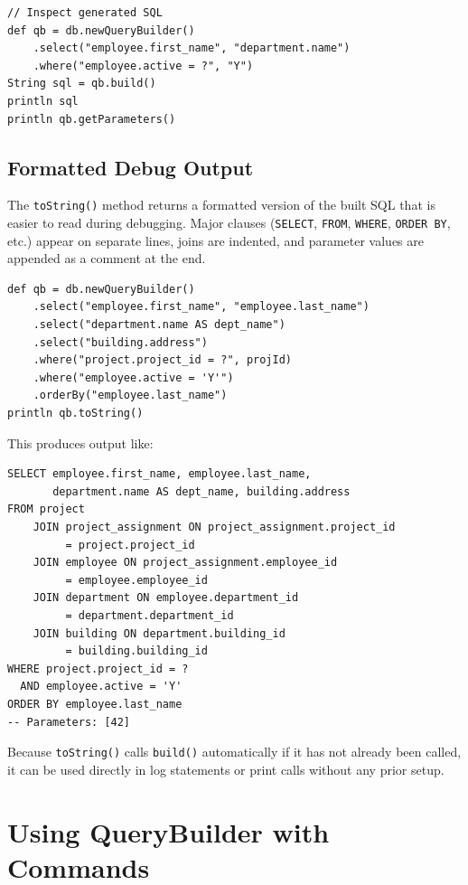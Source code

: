 \begin{lstlisting}[style=groovy]
// Inspect generated SQL
def qb = db.newQueryBuilder()
    .select("employee.first_name", "department.name")
    .where("employee.active = ?", "Y")
String sql = qb.build()
println sql
println qb.getParameters()
\end{lstlisting}

\subsection{Formatted Debug Output}

The \texttt{toString()} method returns a formatted version of the built SQL that is easier to read during debugging.  Major clauses (\texttt{SELECT}, \texttt{FROM}, \texttt{WHERE}, \texttt{ORDER BY}, etc.) appear on separate lines, joins are indented, and parameter values are appended as a comment at the end.

\begin{lstlisting}[style=groovy]
def qb = db.newQueryBuilder()
    .select("employee.first_name", "employee.last_name")
    .select("department.name AS dept_name")
    .select("building.address")
    .where("project.project_id = ?", projId)
    .where("employee.active = 'Y'")
    .orderBy("employee.last_name")
println qb.toString()
\end{lstlisting}

\noindent
This produces output like:

\begin{lstlisting}[style=sql]
SELECT employee.first_name, employee.last_name,
       department.name AS dept_name, building.address
FROM project
    JOIN project_assignment ON project_assignment.project_id
         = project.project_id
    JOIN employee ON project_assignment.employee_id
         = employee.employee_id
    JOIN department ON employee.department_id
         = department.department_id
    JOIN building ON department.building_id
         = building.building_id
WHERE project.project_id = ?
  AND employee.active = 'Y'
ORDER BY employee.last_name
-- Parameters: [42]
\end{lstlisting}

\noindent
Because \texttt{toString()} calls \texttt{build()} automatically if it has not already been called, it can be used directly in log statements or print calls without any prior setup.

\section{Using QueryBuilder with Commands}
\label{sec:qb-command}

